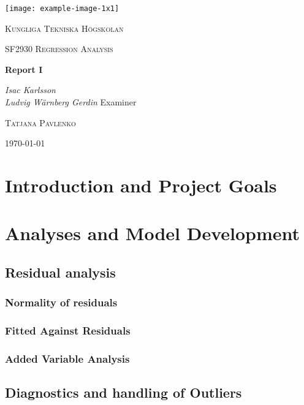 \documentclass[11pt]{article}
\author{Ludde}
\date{\today}
\title{}
\begin{document}
\begin{titlepage}
\centering
\texttt{[image: example-image-1x1]}\par\vspace{1cm}
{\scshape\LARGE Kungliga Tekniska Högskolan \par}
\vspace{1cm}
{\scshape\Large SF2930 Regression Analysis \par}
\vspace{1.5cm}
{\huge\bfseries Report I \\  \par}
\vspace{2cm}
{\Large\itshape Isac Karlsson\\ Ludvig Wärnberg Gerdin}
\vfill
Examiner \par
\textsc{Tatjana Pavlenko}

\vfill

{\large \today\par}
\end{titlepage}

\newpage
\tableofcontents
\newpage

\section{Introduction and Project Goals}
\label{sec:orgc285b77}
\section{Analyses and Model Development}
\label{sec:orgf58e831}
\subsection{Residual analysis}
\label{sec:org54c9553}
\subsubsection{Normality of residuals}
\label{sec:orgb1489e9}
\subsubsection{Fitted Against Residuals}
\label{sec:orgf548324}
\subsubsection{Added Variable Analysis}
\label{sec:org9286e96}
\subsection{Diagnostics and handling of Outliers}
\label{sec:org803ae35}
\end{document}
